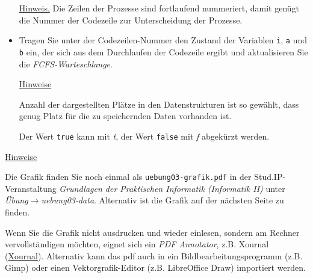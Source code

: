 \documentclass{uebungsblatt}
\begin{document}
\begin{aufgabe}
\begin{itemize}
\underline{Hinweis.} Die Zeilen der Prozesse sind fortlaufend
nummeriert, damit genügt die Nummer der Codezeile zur Unterscheidung 
der Prozesse. 

\item
Tragen Sie unter
der Codezeilen-Nummer den Zustand der Variablen \texttt{i}, \texttt{a} und \texttt{b} ein, der
sich aus dem Durchlaufen der Codezeile ergibt und aktualisieren Sie die \textit{FCFS-Warteschlange}.

\underline{Hinweise} 

Anzahl der dargestellten Plätze in den Datenstrukturen 
ist so gewählt, dass genug Platz für die zu speichernden Daten vorhanden ist.

Der Wert \texttt{true} kann mit \textit{t}, der Wert \texttt{false} mit \textit{f} abgekürzt werden.
\end{itemize}

\pagebreak

\bigskip
\begin{center}
\resizebox{\linewidth}{!}{}
\end{center}

\medskip
\underline{Hinweise}

\medskip
Die Grafik finden Sie noch einmal als \texttt{uebung03-grafik.pdf}
in der Stud.IP-Veranstaltung 
\textit{Grundlagen der Praktischen Informatik (Informatik II)} unter 
\textit{Übung}$\rightarrow$\textit{uebung03-data}. Alternativ ist die Grafik auf der nächsten Seite zu finden.

\medskip
Wenn Sie die Grafik nicht ausdrucken 
und wieder einlesen, sondern am Rechner vervollständigen möchten,
eignet sich ein \textit{PDF Annotator}, z.B. Xournal (\href{http://xournal.sourceforge.net/}{Xournal}). Alternativ kann das pdf auch in ein
Bildbearbeitungsprogramm (z.B. Gimp) oder 
einen Vektorgrafik-Editor (z.B. LibreOffice Draw)
importiert werden.


\newpage
\end{aufgabe}
\end{document}
